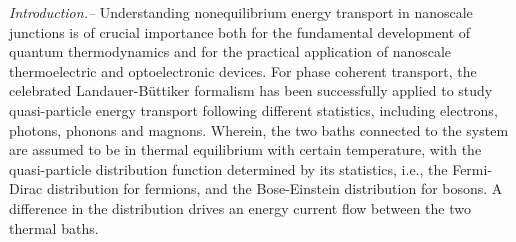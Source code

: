\documentclass[aps
,twocolumn
,floatfix,footinbib,prl,longbibliography
]{revtex4-1}
\begin{document}

\emph {Introduction.--} 
Understanding nonequilibrium energy transport in nanoscale junctions is of crucial importance both for the fundamental development of quantum thermodynamics and for the practical application of nanoscale thermoelectric and optoelectronic devices. For phase coherent transport, the celebrated Landauer-B\"uttiker formalism has been successfully applied to study quasi-particle energy transport following different statistics, including electrons\cite{imry1999conductance}, photons\cite{ojanen2008mesoscopic,biehs2010mesoscopic,zhang2018energy,benabdallah2014near}, phonons\cite{rego1998quantized,mingo2005carbon,yamamoto2006nonequilibrium,wang2006nonequilibrium,wang2007nonequilibrium,wang2008quantum,ruokola2009thermal,li2012colloquium,taylor2015quantum,wang2016landauer} and magnons\cite{wang2004spin}.
Wherein, the two baths connected to the system are assumed to be in thermal equilibrium with certain temperature, with the quasi-particle distribution function  determined by its statistics, i.e., the Fermi-Dirac distribution for fermions, and the Bose-Einstein distribution for bosons. A difference in the distribution drives an energy current flow between the two thermal baths. 

\end{document}
